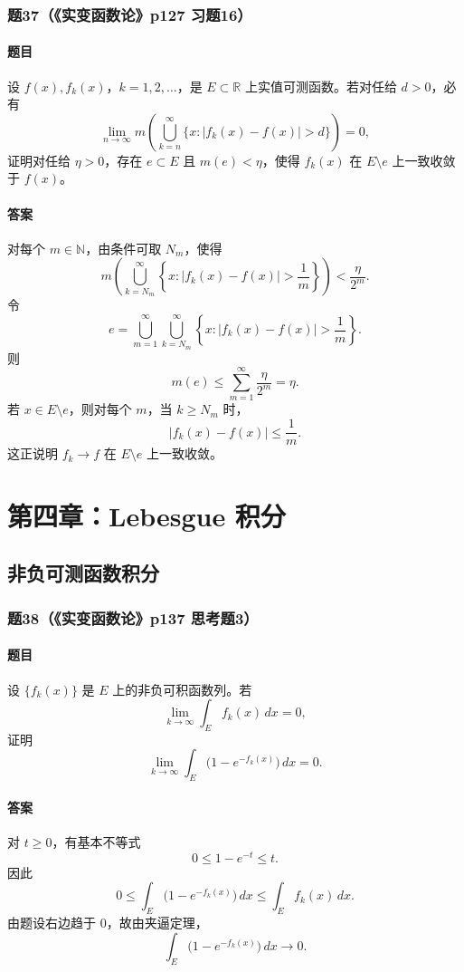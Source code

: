 \documentclass{article}
\newcommand{\R}{\mathbb{R}}
\newcommand{\N}{\mathbb{N}}
\newcommand{\meas}{m}
\begin{document}
	\subsubsection*{题37（《实变函数论》p127 习题16）}
	\paragraph{题目}设 $f(x),f_k(x)$，$k=1,2,\ldots$，是 $E\subset\R$ 上实值可测函数。若对任给 $d>0$，必有
	\[
	\lim_{n\to\infty}\meas\left(\bigcup_{k=n}^{\infty}\{x:|f_k(x)-f(x)|>d\}\right)=0,
	\]
	证明对任给 $\eta>0$，存在 $e\subset E$ 且 $\meas(e)<\eta$，使得 $f_k(x)$ 在 $E\setminus e$ 上一致收敛于 $f(x)$。
	
	\paragraph{答案}对每个 $m\in\N$，由条件可取 $N_m$，使得
	\[
	\meas\left(\bigcup_{k=N_m}^{\infty}\left\{x:|f_k(x)-f(x)|>\frac1m\right\}\right)<\frac{\eta}{2^m}.
	\]
	令
	\[
	e=\bigcup_{m=1}^{\infty}\bigcup_{k=N_m}^{\infty}\left\{x:|f_k(x)-f(x)|>\frac1m\right\}.
	\]
	则
	\[
	\meas(e)\le\sum_{m=1}^{\infty}\frac{\eta}{2^m}=\eta.
	\]
	若 $x\in E\setminus e$，则对每个 $m$，当 $k\ge N_m$ 时，
	\[
	|f_k(x)-f(x)|\le\frac1m.
	\]
	这正说明 $f_k\to f$ 在 $E\setminus e$ 上一致收敛。
	
	
	
	\section{第四章：Lebesgue 积分}
	
	\subsection{非负可测函数积分}
	
	\subsubsection*{题38（《实变函数论》p137 思考题3）}
	\paragraph{题目}设 $\{f_k(x)\}$ 是 $E$ 上的非负可积函数列。若
	\[
	\lim_{k\to\infty}\int_E f_k(x)\,dx=0,
	\]
	证明
	\[
	\lim_{k\to\infty}\int_E\bigl(1-e^{-f_k(x)}\bigr)\,dx=0.
	\]
	
	\paragraph{答案}对 $t\ge0$，有基本不等式
	\[
	0\le 1-e^{-t}\le t.
	\]
	因此
	\[
	0\le\int_E\bigl(1-e^{-f_k(x)}\bigr)\,dx
	\le\int_E f_k(x)\,dx.
	\]
	由题设右边趋于 $0$，故由夹逼定理，
	\[
	\int_E\bigl(1-e^{-f_k(x)}\bigr)\,dx\to0.
	\]
	
\end{document}
